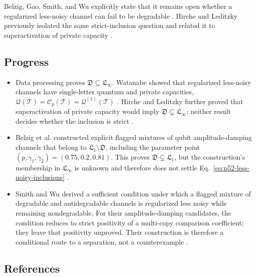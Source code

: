 Belzig, Gao, Smith, and Wu explicitly state that it remains open whether a
regularized less-noisy channel can fail to be degradable
.  Hirche and Leditzky previously
isolated the same strict-inclusion question and related it to superactivation
of private capacity .

\subsection*{Progress}

\begin{itemize}
  \item Data processing proves
  $\mathfrak D\subseteq\mathfrak L_\infty$.  Watanabe showed that regularized
  less-noisy channels have single-letter quantum and private capacities,
  $\mathcal Q(\mathcal T)=\mathcal C_p(\mathcal T)
  =\mathcal Q^{(1)}(\mathcal T)$
  .  Hirche and Leditzky further proved
  that superactivation of private capacity would imply
  $\mathfrak D\subsetneq\mathfrak L_\infty$; neither result decides whether
  the inclusion is strict .

  \item Belzig et al. constructed explicit flagged mixtures of qubit
  amplitude-damping channels that belong to
  $\mathfrak L_1\setminus\mathfrak D$, including the parameter point
  $(p,\gamma_1,\gamma_2)=(0.75,0.2,0.81)$.  This proves
  $\mathfrak D\subsetneq\mathfrak L_1$, but the construction's membership in
  $\mathfrak L_\infty$ is unknown and therefore does not settle
  Eq.~\eqref{eq:p52-less-noisy-inclusions}
  .

  \item Smith and Wu derived a sufficient condition under which a flagged
  mixture of degradable and antidegradable channels is regularized less noisy
  while remaining nondegradable.  For their amplitude-damping candidates, the
  condition reduces to strict positivity of a multi-copy comparison
  coefficient; they leave that positivity unproved.  Their construction is
  therefore a conditional route to a separation, not a counterexample
  .
\end{itemize}

\subsection*{References}

